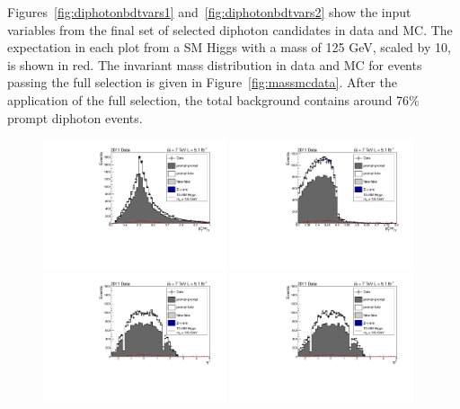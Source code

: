 Figures~\ref{fig:diphotonbdtvars1} and~\ref{fig:diphotonbdtvars2} show the input variables from the 
final set of selected diphoton candidates in data and MC. 
The expectation in each plot from a SM Higgs with a mass of 125 GeV, scaled by 10, is shown in red. 
The invariant mass distribution in data and MC for events passing the full
selection is given in Figure~\ref{fig:massmcdata}. After the application of the full selection, 
the total background contains around 76\% prompt diphoton events.

\begin{figure}[hbt!]
\begin{center}
  \includegraphics[width=0.48\textwidth]{hgg7TeV/variablePlots/pt_1om}
  \includegraphics[width=0.48\textwidth]{hgg7TeV/variablePlots/pt_2om}\\
  \includegraphics[width=0.48\textwidth]{hgg7TeV/variablePlots/phoeta_1}
  \includegraphics[width=0.48\textwidth]{hgg7TeV/variablePlots/phoeta_2}\\

\end{center}
\end{figure}
